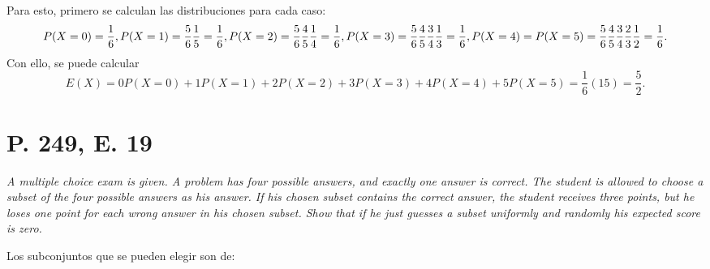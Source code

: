 \documentclass[paper=leter, fontsize=11pt]{scrartcl}
\numberwithin{equation}{section}		%
\numberwithin{figure}{section}			%
\numberwithin{table}{section}				%
\begin{document}
Para esto, primero se calculan las distribuciones para cada caso:
\begin{dmath*}
    {P(X = 0) = \frac{1}{6}}, \\
    {P(X = 1) = \frac{5}{6} \frac{1}{5} = \frac{1}{6}}, \\
    {P(X = 2) = \frac{5}{6} \frac{4}{5} \frac{1}{4} = \frac{1}{6}}, \\
    {P(X = 3) = \frac{5}{6} \frac{4}{5} \frac{3}{4} \frac{1}{3} = \frac{1}{6}}, \\
    {P(X = 4) = P(X = 5) = \frac{5}{6} \frac{4}{5} \frac{3}{4} \frac{2}{3} \frac{1}{2} = \frac{1}{6}}.
\end{dmath*}
Con ello, se puede calcular
\begin{dmath*}
    E(X) = {0 P(X = 0) + 1 P(X = 1) + 2 P(X = 2) + 3 P(X = 3) + 4 P(X = 4) + 5 P(X = 5)} 
         = \frac{1}{6} (15)
         = \frac{5}{2}.
\end{dmath*}

\section*{P. 249, E. 19}
\emph{A multiple choice exam is given. A problem has four possible answers, and exactly one answer is correct. The student is allowed to choose a subset of the four possible answers as his answer. If his chosen subset contains the correct answer, the student receives three points, but he loses one point for each wrong answer in his chosen subset. Show that if he just guesses a subset uniformly and randomly his expected score is zero.}

Los subconjuntos que se pueden elegir son de:
\end{document}
